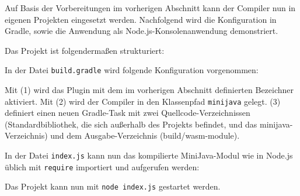 Auf Basis der Vorbereitungen im vorherigen Abschnitt kann der Compiler nun in eigenen Projekten eingesetzt werden. Nachfolgend wird die Konfiguration in Gradle, sowie die Anwendung als Node.js-Konsolenanwendung demonstriert.

Das Projekt ist folgendermaßen strukturiert:



In der Datei \lstinline{build.gradle} wird folgende Konfiguration vorgenommen:



Mit (1) wird das Plugin mit dem im vorherigen Abschnitt definierten Bezeichner aktiviert. Mit (2) wird der Compiler in den Klassenpfad \lstinline{minijava} gelegt. (3) definiert einen neuen Gradle-Task mit zwei Quellcode-Verzeichnissen (Standardbibliothek, die sich außerhalb des Projekts befindet, und das minijava-Verzeichnis) und dem Ausgabe-Verzeichnis (build/wasm-module).

In der Datei \lstinline{index.js} kann nun das kompilierte MiniJava-Modul wie in Node.js üblich mit \lstinline{require} importiert und aufgerufen werden:



Das Projekt kann nun mit \lstinline{node index.js} gestartet werden.
